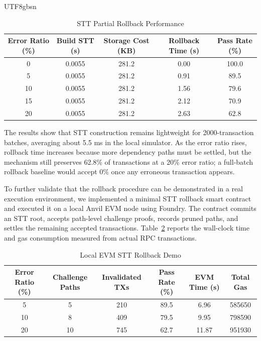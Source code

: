 \documentclass[runningheads]{llncs}
\begin{document}
\begin{CJK*}{UTF8}{gbsn}
\begin{table}[h!]
\centering
\caption{STT Partial Rollback Performance}
\label{tab:rollback-experiment-new}
\renewcommand{\arraystretch}{1}
\begin{tabular}{ccccc}
\toprule
Error Ratio (\%) & Build STT (s) & Storage Cost (KB) & Rollback Time (s) & Pass Rate (\%) \\
\midrule
0  & 0.0055 & 281.2 & 0.00 & 100.0 \\
5  & 0.0055 & 281.2 & 0.91 & 89.5 \\
10 & 0.0055 & 281.2 & 1.56 & 79.6 \\
15 & 0.0055 & 281.2 & 2.12 & 70.9 \\
20 & 0.0055 & 281.2 & 2.63 & 62.8 \\
\bottomrule
\end{tabular}
\end{table}

The results show that STT construction remains lightweight for 2000-transaction batches, averaging about 5.5 ms in the local simulator. As the error ratio rises, rollback time increases because more dependency paths must be settled, but the mechanism still preserves 62.8\% of transactions at a 20\% error ratio; a full-batch rollback baseline would accept 0\% once any erroneous transaction appears.

To further validate that the rollback procedure can be demonstrated in a real execution environment, we implemented a minimal STT rollback smart contract and executed it on a local Anvil EVM node using Foundry. The contract commits an STT root, accepts path-level challenge proofs, records pruned paths, and settles the remaining accepted transactions. Table~\ref{tab:evm-rollback-demo} reports the wall-clock time and gas consumption measured from actual RPC transactions.

\begin{table}[h!]
\centering
\caption{Local EVM STT Rollback Demo}
\label{tab:evm-rollback-demo}
\renewcommand{\arraystretch}{1}
\begin{tabular}{cccccc}
\toprule
Error Ratio (\%) & Challenge Paths & Invalidated TXs & Pass Rate (\%) & EVM Time (s) & Total Gas \\
\midrule
5  & 5  & 210 & 89.5 & 6.96  & 585650 \\
10 & 8  & 409 & 79.5 & 9.95  & 798590 \\
20 & 10 & 745 & 62.7 & 11.87 & 951930 \\
\bottomrule
\end{tabular}
\end{table}


\end{CJK*}
\end{document}
